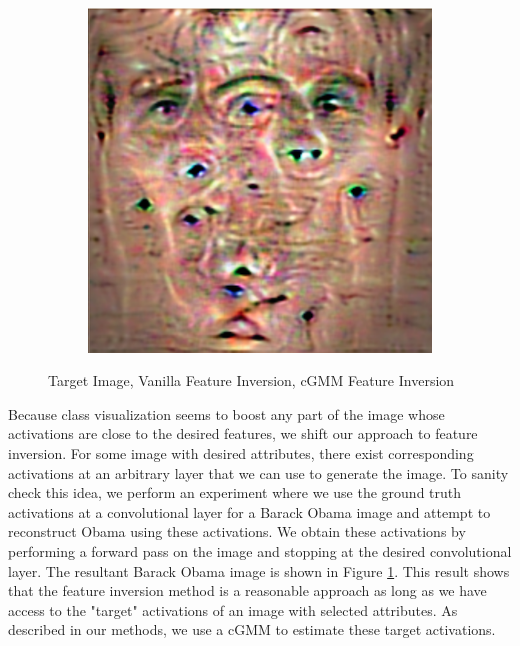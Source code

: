 \documentclass[10pt,twocolumn,letterpaper]{article}
\begin{document}
\begin{figure}[h!]
\begin{subfigure}[b]{0.24\linewidth}
    \end{subfigure}
    \begin{subfigure}[b]{0.24\linewidth}
        \includegraphics[width=\linewidth]{images/outputs/uglyface.png}
    \end{subfigure}
    \caption{Target Image, Vanilla Feature Inversion, cGMM Feature Inversion}\label{fig:obamaout}
\end{figure}
Because class visualization seems to boost any part of the image whose activations are close to the desired features, we shift our approach to feature inversion. For some image with desired attributes, there exist corresponding activations at an arbitrary layer that we can use to generate the image. To sanity check this idea, we perform an experiment where we use the ground truth activations at a convolutional layer for a Barack Obama image and attempt to reconstruct Obama using these activations. We obtain these activations by performing a forward pass on the image and stopping at the desired convolutional layer. The resultant Barack Obama image is shown in Figure \ref{fig:obamaout}. This result shows that the feature inversion method is a reasonable approach as long as we have access to the "target" activations of an image with selected attributes. As described in our methods, we use a cGMM to estimate these target activations. 
\end{document}
